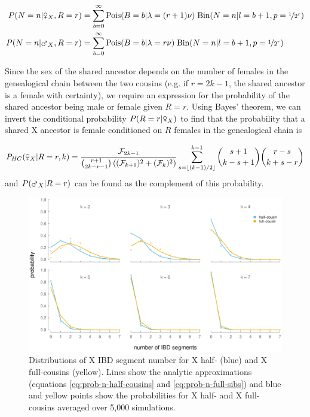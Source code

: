 \documentclass[11pt]{article}
\newcommand{\msxa}{\mars_X}
\newcommand{\fsxa}{\venus_X}
\begin{document}
\begin{align}
  P(N = n | \fsxa, R=r) &= \sum_{b=0}^\infty  \text{Pois}(B = b | \lambda = (r+1)\nu) \; \text{Bin}(N=n | l = b + 1, p=\nicefrac{1}{2^r}) \label{eq:prob-n-each-female} \\
  P(N = n | \msxa, R=r) &= \sum_{b=0}^\infty  \text{Pois}(B = b | \lambda = r\nu) \; \text{Bin}(N=n | l = b + 1, p=\nicefrac{1}{2^r}) \label{eq:prob-n-each-male} 
\end{align}

Since the sex of the shared ancestor depends on the number of females in the
genealogical chain between the two cousins (e.g. if $r=2k-1$, the shared
ancestor is a female with certainty), we require an expression for the
probability of the shared ancestor being male or female given $R=r$. Using
Bayes' theorem, we can invert the conditional probability $P(R = r | \fsxa)$ to
find that the probability that a shared X ancestor is female conditioned on $R$
females in the genealogical chain is

\begin{equation}
  \label{eq:prob-female-given-r}
  P_{HC}(\fsxa | R=r, k) = \frac{\mathcal{F}_{2k-1} }{ { r+1 \choose 2k-r-1 }  \left( (\mathcal{F}_{k+1})^2 + (\mathcal{F}_k)^2 \right) }
\sum_{s=\lfloor (k-1)/2 \rfloor}^{k-1}  {s + 1 \choose k - s + 1 } { r - s \choose k + s - r }
\end{equation}
%
and $P(\msxa | R=r)$ can be found as the complement of this probability.

\begin{figure}[!ht]
  \centering

  \includegraphics[width=\textwidth]{images/x-full-half-blockcounts}

  \caption{Distributions of X IBD segment number for X half- (blue) and X
full-cousins (yellow). Lines show the analytic approximations (equations
\eqref{eq:prob-n-half-cousins} and \eqref{eq:prob-n-full-sibs}) and blue and
yellow points show the probabilities for X half- and X full-cousins averaged
over 5,000 simulations.}

  \label{fig:half-cousin-segment-number}
\end{figure}
\end{document}
